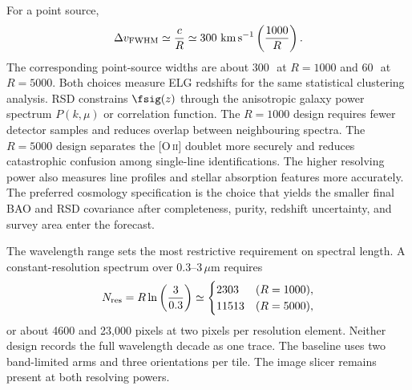 For a point source,
\begin{equation}
  \Delta v_{\rm FWHM}\simeq \frac{c}{R}
  \simeq 300\ {\rm km\,s^{-1}}\left(\frac{1000}{R}\right).
\end{equation}
The corresponding point-source widths are about $300$\,\kms\ at $R=1000$ and $60$\,\kms\ at $R=5000$. Both choices measure ELG redshifts for the same statistical clustering analysis. RSD constrains $\fsig(z)$ through the anisotropic galaxy power spectrum $P(k,\mu)$ or correlation function. The $R=1000$ design requires fewer detector samples and reduces overlap between neighbouring spectra. The $R=5000$ design separates the [O\,\textsc{ii}] doublet more securely and reduces catastrophic confusion among single-line identifications. The higher resolving power also measures line profiles and stellar absorption features more accurately. The preferred cosmology specification is the choice that yields the smaller final BAO and RSD covariance after completeness, purity, redshift uncertainty, and survey area enter the forecast.

The wavelength range sets the most restrictive requirement on spectral length. A constant-resolution spectrum over 0.3--3\,$\mu$m requires
\begin{equation}
  N_{\rm res}=R\ln\left(\frac{3}{0.3}\right)
  \simeq
  \begin{cases}
  2303 & (R=1000),\\
  11513 & (R=5000),
  \end{cases}
\end{equation}
or about 4600 and 23,000 pixels at two pixels per resolution element. Neither design records the full wavelength decade as one trace. The baseline uses two band-limited arms and three orientations per tile. The image slicer remains present at both resolving powers.

